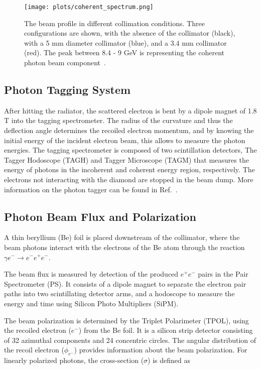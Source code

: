 {\begin{figure}[H]
    \centering
        \texttt{[image: plots/coherent\_spectrum.png]}
        \caption{The beam profile in different collimation conditions. Three configurations are shown, with the absence of the collimator (black), with a 5 mm diameter collimator (blue), and a 3.4 mm collimator (red). The peak between 8.4 - 9 GeV is representing the coherent photon beam component~\cite{GlueX97}.}
        \label{fig.2.1.1}
\end{figure}

\subsection{Photon Tagging System}
\label{p.2.1.2}

After hitting the radiator, the scattered electron is bent by a dipole magnet of 1.8 T into the tagging spectrometer. The radius of the curvature and thus the deflection angle determines the recoiled electron momentum, and by knowing the initial energy of the incident electron beam, this allows to measure the photon energies. The tagging spectrometer is composed of two scintillation detectors, The Tagger Hodoscope (TAGH) and Tagger Microscope (TAGM) that measures the energy of photons in the incoherent and coherent energy region, respectively. The electrons not interacting with the diamond are stopped in the beam dump. More information on the photon tagger can be found in Ref.~\cite{GlueX97}.

\subsection{Photon Beam Flux and Polarization}
\label{p.2.1.3}

A thin beryllium (Be) foil is placed downstream of the collimator, where the beam photons interact with the electrons of the Be atom through the reaction $\gamma e^- \rightarrow e^-e^+e^-$.
~\par The beam flux is measured by detection of the produced $e^+e^-$ pairs in the Pair Spectrometer (PS). It consists of a dipole magnet to separate the electron pair paths into two scintillating detector arms, and a hodoscope to measure the energy and time using Silicon Photo Multipliers (SiPM).
~\par The beam polarization is determined by the Triplet Polarimeter (TPOL), using the recoiled electron ($e^-$) from the Be foil. It is a silicon strip detector consisting of 32 azimuthal components and 24 concentric circles. The angular distribution of the recoil electron ($\phi_{e^-}$) provides information about the beam polarization. For linearly polarized photons, the cross-section ($\sigma$) is defined as

}
